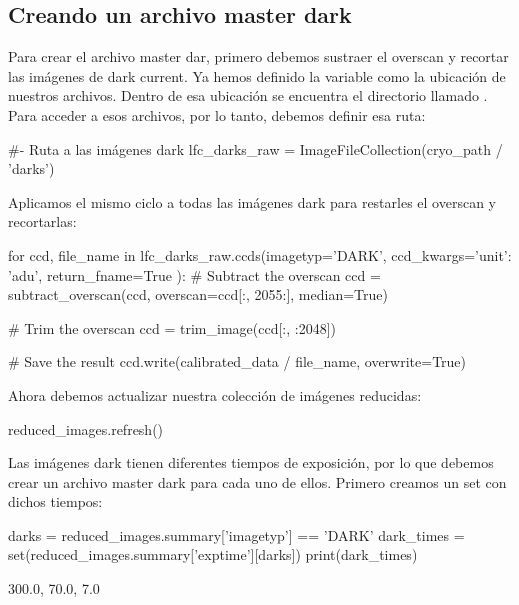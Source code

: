 \subsection{Creando un archivo master dark}
Para crear el archivo master dar, primero debemos sustraer el overscan y recortar las imágenes de dark current. Ya hemos definido la variable  como la ubicación de nuestros archivos. Dentro de esa ubicación se encuentra el directorio llamado . Para acceder a esos archivos, por lo tanto, debemos definir esa ruta:

\begin{pyin}[]
#- Ruta a las imágenes dark
lfc_darks_raw = ImageFileCollection(cryo_path / 'darks')
\end{pyin}

Aplicamos el mismo ciclo  a todas las imágenes dark para restarles el overscan y recortarlas:

\begin{pyin}
for ccd, file_name in lfc_darks_raw.ccds(imagetyp='DARK',            
                                         ccd_kwargs={'unit': 'adu'},
                                         return_fname=True           
                                        ):    
    # Subtract the overscan
    ccd = subtract_overscan(ccd, overscan=ccd[:, 2055:], 
                            median=True)
    
    # Trim the overscan
    ccd = trim_image(ccd[:, :2048])
    
    # Save the result
    ccd.write(calibrated_data / file_name, overwrite=True)
\end{pyin}

Ahora debemos actualizar nuestra colección de imágenes reducidas:

\begin{pyin}
reduced_images.refresh()
\end{pyin}

Las imágenes dark tienen diferentes tiempos de exposición, por lo que debemos crear un archivo master dark para cada uno de ellos. Primero creamos un set con dichos tiempos:

\begin{pyin}
darks = reduced_images.summary['imagetyp'] == 'DARK'
dark_times = set(reduced_images.summary['exptime'][darks])
print(dark_times)
\end{pyin}
\begin{pyprint}
{300.0, 70.0, 7.0}
\end{pyprint}

